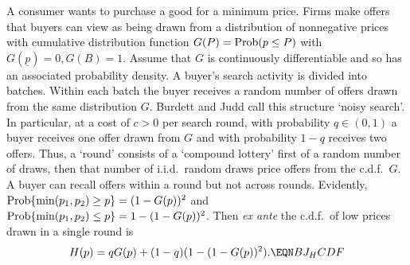 A consumer wants to purchase a good  for a minimum price. Firms make offers that buyers can view as being drawn from a distribution of nonnegative prices
with cumulative distribution function $G(P) = {\rm Prob} (p \leq P)$ with $G(\underline p ) = 0, G(B) = 1$. Assume that $G$ is continuously differentiable and so has an associated probability density.   A buyer's
 search activity is divided into batches.  Within each batch the buyer receives a random number of offers drawn from the same distribution $G$.
 Burdett and Judd call
 this structure `noisy search'.
 In particular, at a cost of $c>0$ per search round, with
probability $q \in (0,1)$ a buyer receives one offer drawn from $G$  and with probability $1-q$ receives two offers.  Thus, a `round'
consists of a `compound lottery' first of a random number of draws, then  that number of i.i.d.\ random draws price offers from the c.d.f.\ $G$.  A buyer
can  recall
 offers within a round but not across rounds.
Evidently, ${\rm Prob} \{\min (p_1, p_2) \geq p\} = (1-G(p))^2$ and $
{\rm Prob}\{\min (p_1,p_2) \leq p \} = 1 - (1-G(p))^2 $.  Then {\it ex ante\/} the c.d.f.\ of low prices drawn in a single round is
$$ H(p) = q G(p) + (1-q) (1 - (1-G(p))^2 ) .  \EQN BJ_HCDF $$

